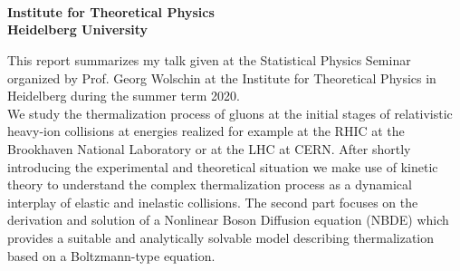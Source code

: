 \begin{center}

	\makeatletter
	\thispagestyle{plain}
	\LARGE\textbf{\@title} \\
	\vspace{2mm}
	\large\bfseries{\@author} \\
	\normalfont
	\vspace{2mm}
	\large{\@date} \\
	\vspace{2mm}
	\large{Institute for Theoretical Physics \\
		Heidelberg University} \\
	\makeatother
\end{center}

\normalsize
\noindent This report summarizes my talk given at the Statistical Physics Seminar organized by Prof. Georg Wolschin at the Institute for Theoretical Physics in Heidelberg during the summer term 2020. \\
We study the thermalization process of gluons at the initial stages of relativistic heavy-ion collisions at energies realized for example at the RHIC at the Brookhaven National Laboratory or at the LHC at CERN. After shortly introducing the experimental and theoretical situation we  make use of kinetic theory to understand the complex thermalization process as a dynamical interplay of elastic and inelastic collisions. The second part focuses on the derivation and solution of a Nonlinear Boson Diffusion equation (NBDE) which provides a suitable and  analytically solvable model describing thermalization based on a Boltzmann-type equation.